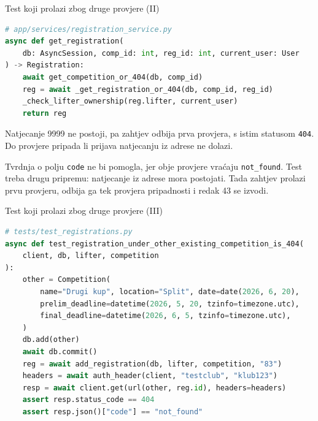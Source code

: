\begin{frame}[fragile]{Test koji prolazi zbog druge provjere (II)}
\begin{lstlisting}[language=python]
# app/services/registration_service.py
async def get_registration(
    db: AsyncSession, comp_id: int, reg_id: int, current_user: User
) -> Registration:
    await get_competition_or_404(db, comp_id)
    reg = await _get_registration_or_404(db, comp_id, reg_id)
    _check_lifter_ownership(reg.lifter, current_user)
    return reg
\end{lstlisting}

\vspace{0.4em}
Natjecanje 9999 ne postoji, pa zahtjev odbija prva provjera, s istim statusom \texttt{404}. Do provjere pripada li prijava natjecanju iz adrese ne dolazi.

\vspace{0.4em}
Tvrdnja o polju \texttt{code} ne bi pomogla, jer obje provjere vraćaju \texttt{not\_found}. Test treba drugu pripremu: natjecanje iz adrese mora postojati. Tada zahtjev prolazi prvu provjeru, odbija ga tek provjera pripadnosti i redak 43 se izvodi.
\end{frame}

\begin{frame}[fragile]{Test koji prolazi zbog druge provjere (III)}
\vspace{-0.2em}
\begin{lstlisting}[language=python]
# tests/test_registrations.py
async def test_registration_under_other_existing_competition_is_404(
    client, db, lifter, competition
):
    other = Competition(
        name="Drugi kup", location="Split", date=date(2026, 6, 20),
        prelim_deadline=datetime(2026, 5, 20, tzinfo=timezone.utc),
        final_deadline=datetime(2026, 6, 5, tzinfo=timezone.utc),
    )
    db.add(other)
    await db.commit()
    reg = await add_registration(db, lifter, competition, "83")
    headers = await auth_header(client, "testclub", "klub123")
    resp = await client.get(url(other, reg.id), headers=headers)
    assert resp.status_code == 404
    assert resp.json()["code"] == "not_found"
\end{lstlisting}
\end{frame}

